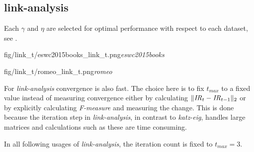 \newpage


\subsection{link-analysis}\label{sec:training:link}

Each $\gamma$ and $\eta$ are selected for optimal performance with respect to each dataset, see .

{fig/link_t/eswc2015books_link_t.png}{\textit{eswc2015books}}

{fig/link_t/romeo_link_t.png}{\textit{romeo}}

For \textit{link-analysis} convergence is also fast. The choice here is to fix $t_{max}$ to a fixed value instead of measuring convergence either by calculating $\| \mathit{IR}_t - \mathit{IR}_{t - 1} \|_2$
or by explicitly calculating \textit{F-measure} and measuring the change. This is done because the iteration step in \textit{link-analysis}, in contrast to \textit{katz-eig}, handles large matrices and calculations such as these are time consuming.

In all following usages of \textit{link-analysis}, the iteration count is fixed to $t_{max} = 3$.


